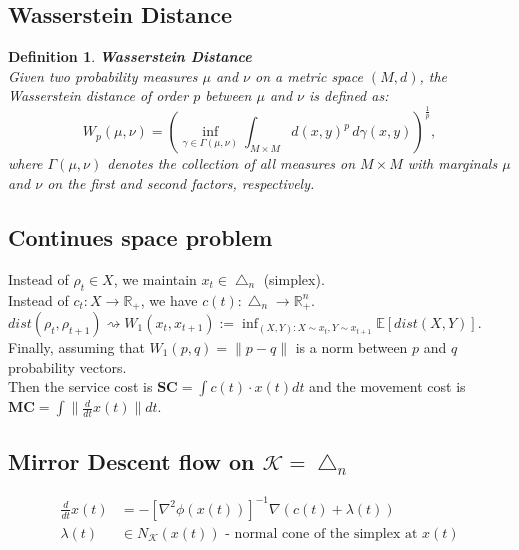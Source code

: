 \documentclass[11pt]{book} %
\newtheorem{definition}{Definition}[section]
\begin{document}
\subsection{Wasserstein Distance}

\begin{definition}{\textbf{Wasserstein Distance}} \\
    Given two probability measures \( \mu \) and \( \nu \) on a metric space \( (M, d) \), the Wasserstein distance of order \( p \) between \( \mu \) and \( \nu \) is defined as:
    \[
    W_p(\mu, \nu) = \left( \inf_{\gamma \in \Gamma(\mu, \nu)} \int_{M \times M} d(x,y)^p \, d\gamma(x,y) \right)^{\frac{1}{p}},
    \]
    where \( \Gamma(\mu, \nu) \) denotes the collection of all measures on \( M \times M \) with marginals \( \mu \) and \( \nu \) on the first and second factors, respectively.
\end{definition}


\subsection{Continues space problem}


Instead of $\rho_t \in X$, we maintain $x_t \in \bigtriangleup_n$ (simplex). \\
Instead of $c_t : X \to \mathbb{R}_+$, we have $c(t) : \bigtriangleup_n \to \mathbb{R}_+^n$. \\
$dist(\rho_t, \rho_{t+1}) \rightsquigarrow W_1(x_t, x_{t+1}) := \inf_{(X, Y) : X \sim x_t, Y \sim x_{t+1}} \mathbb{E} [dist(X, Y)]$. \\
Finally, assuming that $W_1(p,q) = \| p - q \|$ is a norm between $p$ and $q$ probability vectors. \\
Then the service cost is $\textbf{SC} = \int c(t) \cdot x(t) dt$ 
and the movement cost is $\textbf{MC} = \int \| \frac{d}{dt} x(t) \| dt$.

\subsection{Mirror Descent flow on $\mathcal{K} = \bigtriangleup_n$}

\begin{align*}
    \frac{d}{dt} x(t) &= -[\nabla^2 \phi(x(t))]^{-1} \nabla (c(t) + \lambda(t)) \\
    \lambda(t) &\in N_{\mathcal{K}}(x(t)) \text{ - normal cone of the simplex at } x(t) \\
\end{align*}
\end{document}
